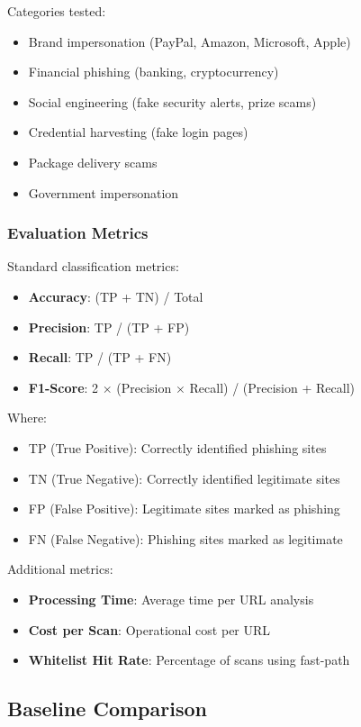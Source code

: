 \documentclass[conference]{IEEEtran}
\begin{document}
Categories tested:
\begin{itemize}
\item Brand impersonation (PayPal, Amazon, Microsoft, Apple)
\item Financial phishing (banking, cryptocurrency)
\item Social engineering (fake security alerts, prize scams)
\item Credential harvesting (fake login pages)
\item Package delivery scams
\item Government impersonation
\end{itemize}

\subsubsection{Evaluation Metrics}

Standard classification metrics:
\begin{itemize}
\item \textbf{Accuracy}: (TP + TN) / Total
\item \textbf{Precision}: TP / (TP + FP)
\item \textbf{Recall}: TP / (TP + FN)
\item \textbf{F1-Score}: 2 $\times$ (Precision $\times$ Recall) / (Precision + Recall)
\end{itemize}

Where:
\begin{itemize}
\item TP (True Positive): Correctly identified phishing sites
\item TN (True Negative): Correctly identified legitimate sites
\item FP (False Positive): Legitimate sites marked as phishing
\item FN (False Negative): Phishing sites marked as legitimate
\end{itemize}

Additional metrics:
\begin{itemize}
\item \textbf{Processing Time}: Average time per URL analysis
\item \textbf{Cost per Scan}: Operational cost per URL
\item \textbf{Whitelist Hit Rate}: Percentage of scans using fast-path
\end{itemize}

\subsection{Baseline Comparison}
\end{document}
